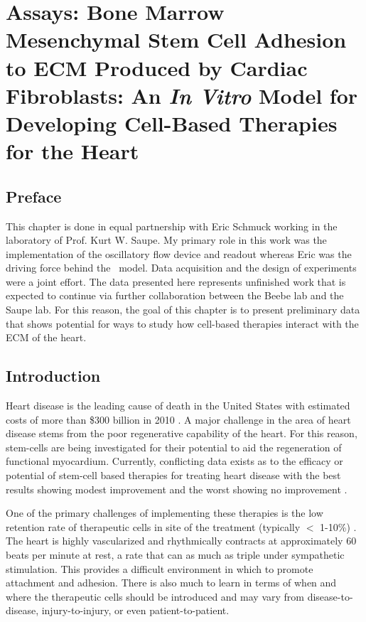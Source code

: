 \chapter{Assays: Bone Marrow Mesenchymal Stem Cell Adhesion to ECM Produced by Cardiac Fibroblasts: An \emph{In Vitro} Model for Developing Cell-Based Therapies for the Heart}\label{Chap:Cardiac}

\section{Preface}
This chapter is done in equal partnership with Eric Schmuck working in the laboratory of Prof. Kurt W. Saupe. My primary role in this work was the implementation of the oscillatory flow device and readout whereas Eric was the driving force behind the \invitro\ model. Data acquisition and the design of experiments were a joint effort. The data presented here represents unfinished work that is expected to continue via further collaboration between the Beebe lab and the Saupe lab. For this reason, the goal of this chapter is to present preliminary data that shows potential for ways to study how cell-based therapies interact with the ECM of the heart.

\section{Introduction}
Heart disease is the leading cause of death in the United States with estimated costs of more than \$300 billion in 2010 \cite{Heron:2009kx,Lloyd-Jones:2010vn}. A major challenge in the area of heart disease stems from the poor regenerative capability of the heart. For this reason, stem-cells are being investigated for their potential to aid the regeneration of functional myocardium. Currently, conflicting data exists as to the efficacy or potential of stem-cell based therapies for treating heart disease with the best results showing modest improvement and the worst showing no improvement \cite{Assmus:2010qf,Beitnes:2009vn,Erbs:2007ve,Meyer:2006ly,Meyer:2009zr,Schachinger:2006bh,Wollert:2004ys}.

One of the primary challenges of implementing these therapies is the low retention rate of therapeutic cells in site of the treatment (typically $<$ 1-10\%) \cite{Freyman:2006nx,Ly:2009cr,Menasche:2010dq,Terrovitis:2009oq,Hofmann:2005tw}. The heart is highly vascularized and rhythmically contracts at approximately 60 beats per minute at rest, a rate that can as much as triple under sympathetic stimulation. This provides a difficult environment in which to promote attachment and adhesion. There is also much to learn in terms of when and where the therapeutic cells should be introduced and may vary from disease-to-disease, injury-to-injury, or even patient-to-patient.

